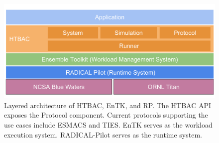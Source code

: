 











\begin{figure}
  \centering
  \includegraphics[width=\columnwidth]{figures/building_blocks.pdf}
  \caption{Layered architecture of HTBAC, EnTK, and RP. The HTBAC API
  exposes the Protocol component. Current protocols supporting the use cases
  include ESMACS and TIES. EnTK serves as the workload execution system.
  RADICAL-Pilot serves as the runtime system.}
\label{fig:blockdiagram}
\end{figure}

